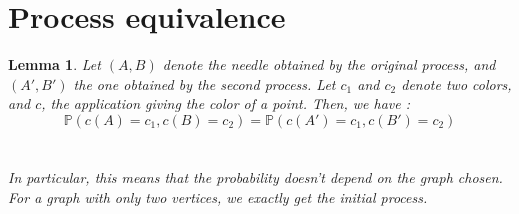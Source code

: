 \documentclass[a4paper,11pt]{article}
\newtheorem{lemma}{Lemma}
\theoremstyle{definition}
\theoremstyle{remark}
\begin{document}
\section{Process equivalence}
\begin{lemma}\label{huitre}
Let $(A,B)$ denote the needle obtained by the original process, and
$(A',B')$ the one obtained by the second process. Let $c_1$ and $c_2$ denote two colors, and $c$, the application giving the color of a point. Then, we have :\\
 $$\mathbb{P}(c(A) = c_1 , c(B) = c_2) = \mathbb{P}(c(A') = c_1, c(B') = c_2) $$ \\
 \\
 In particular, this means that the probability doesn't depend on the graph chosen. For a graph with only two vertices, we exactly get the initial process.
\end{lemma}
\end{document}
